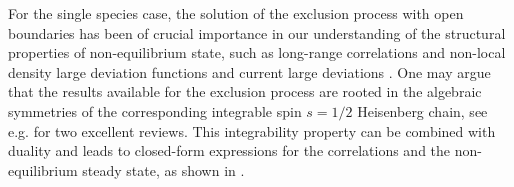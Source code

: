 \documentclass[10pt]{article}
\numberwithin{equation}{section}
\numberwithin{equation}{subsection}
\begin{document}
 

For the single species case,  the solution of the exclusion process with open boundaries \cite{derrida1993exact,1993JSP....72..277S} has been of crucial importance in our understanding of the structural properties of non-equilibrium state, such as long-range correlations \cite{spohn1983long} and non-local density large deviation functions \cite{derrida2007non,derrida1998exact} and current large deviations \cite{mallick2022exact,bodineau2005current}. One may argue that the results available for the exclusion process are rooted in the algebraic symmetries of the corresponding integrable spin $s=1/2$ Heisenberg chain, see e.g. \cite{schutzManyBody,SSEPReviewRagoucy} for two excellent reviews.
%
This integrability property can be combined with duality and leads to closed-form expressions for the correlations and the non-equilibrium steady state, as shown in \cite{frassek2020eigenstates,frassek2020duality}.


\end{document}
